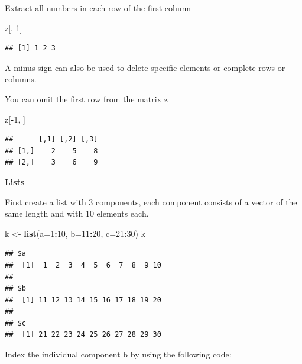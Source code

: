 \documentclass[
]{book}
\newenvironment{Shaded}{\begin{snugshade}}{\end{snugshade}}
\newcommand{\DataTypeTok}[1]{\textcolor[rgb]{0.13,0.29,0.53}{#1}}
\newcommand{\DecValTok}[1]{\textcolor[rgb]{0.00,0.00,0.81}{#1}}
\newcommand{\KeywordTok}[1]{\textcolor[rgb]{0.13,0.29,0.53}{\textbf{#1}}}
\newcommand{\NormalTok}[1]{#1}
\newcommand{\OperatorTok}[1]{\textcolor[rgb]{0.81,0.36,0.00}{\textbf{#1}}}
\newcommand{\StringTok}[1]{\textcolor[rgb]{0.31,0.60,0.02}{#1}}
\begin{document}
Extract all numbers in each row of the first column

\begin{Shaded}
\begin{Highlighting}[]
\NormalTok{z[, }\DecValTok{1}\NormalTok{]}
\end{Highlighting}
\end{Shaded}

\begin{verbatim}
## [1] 1 2 3
\end{verbatim}

A minus sign can also be used to delete specific elements or complete
rows or columns.

You can omit the first row from the matrix z

\begin{Shaded}
\begin{Highlighting}[]
\NormalTok{z[}\OperatorTok{-}\DecValTok{1}\NormalTok{, ]}
\end{Highlighting}
\end{Shaded}

\begin{verbatim}
##      [,1] [,2] [,3]
## [1,]    2    5    8
## [2,]    3    6    9
\end{verbatim}

\textbf{Lists}

First create a list with 3 components, each component consists of a
vector of the same length and with 10 elements each.

\begin{Shaded}
\begin{Highlighting}[]
\NormalTok{k <-}\StringTok{ }\KeywordTok{list}\NormalTok{(}\DataTypeTok{a=}\DecValTok{1}\OperatorTok{:}\DecValTok{10}\NormalTok{, }\DataTypeTok{b=}\DecValTok{11}\OperatorTok{:}\DecValTok{20}\NormalTok{, }\DataTypeTok{c=}\DecValTok{21}\OperatorTok{:}\DecValTok{30}\NormalTok{)}
\NormalTok{k}
\end{Highlighting}
\end{Shaded}

\begin{verbatim}
## $a
##  [1]  1  2  3  4  5  6  7  8  9 10
## 
## $b
##  [1] 11 12 13 14 15 16 17 18 19 20
## 
## $c
##  [1] 21 22 23 24 25 26 27 28 29 30
\end{verbatim}

Index the individual component b by using the following code:

\begin{Shaded}
\end{Shaded}
\end{document}
